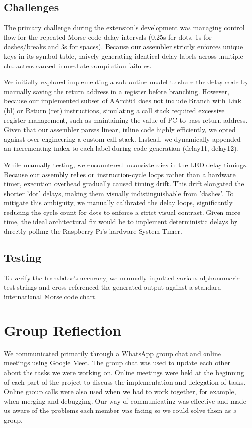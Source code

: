 \documentclass[11pt]{article}
\begin{document}
\subsection{Challenges}
The primary challenge during the extension's development was managing control flow for the repeated Morse code delay intervals (0.25s for dots, 1s for dashes/breaks and 3s for spaces). Because our assembler strictly enforces unique keys in its symbol table, naively generating identical delay labels across multiple characters caused immediate compilation failures.

We initially explored implementing a subroutine model to share the delay code by manually saving the return address in a register before branching. However, because our implemented subset of AArch64 does not include Branch with Link (bl) or Return (ret) instructions, simulating a call stack required excessive register management, such as maintaining the value of PC to pass return address. Given that our assembler parses linear, inline code highly efficiently, we opted against over engineering a custom call stack. Instead, we dynamically appended an incrementing index to each label during code generation (delay11, delay12).

While manually testing, we encountered inconsistencies in the LED delay timings. Because our assembly relies on instruction-cycle loops rather than a hardware timer, execution overhead gradually caused timing drift. This drift elongated the shorter 'dot' delays, making them visually indistinguishable from 'dashes'. To mitigate this ambiguity, we manually calibrated the delay loops, significantly reducing the cycle count for dots to enforce a strict visual contrast. Given more time, the ideal architectural fix would be to implement deterministic delays by directly polling the Raspberry Pi's hardware System Timer.

\subsection{Testing}
To verify the translator's accuracy, we manually inputted various alphanumeric test strings and cross-referenced the generated output against a standard international Morse code chart. 

\section{Group Reflection}
We communicated primarily through a WhatsApp group chat and online meetings using Google Meet. The group chat was used to update each other about the tasks we were working on. Online meetings were held at the beginning of each part of the project to discuss the implementation and delegation of tasks. Online group calls were also used when we had to work together, for example, when merging and debugging. Our way of communicating was effective and made us aware of the problems each member was facing so we could solve them as a group.
\end{document}
